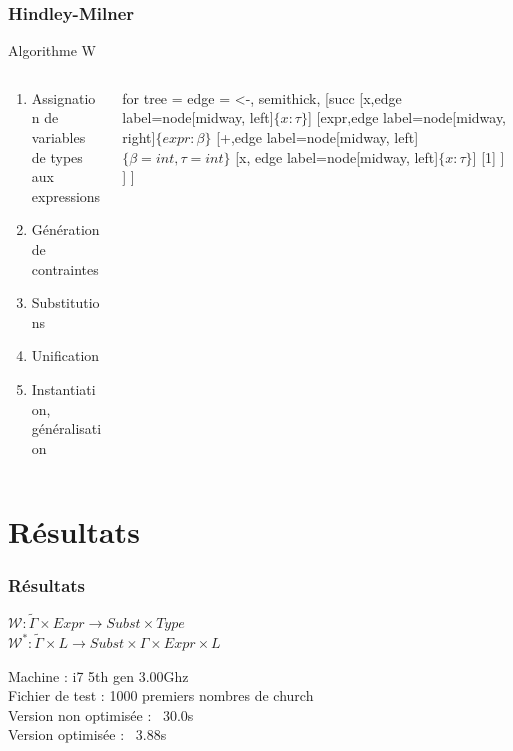 \documentclass{beamer}
\begin{document}
\begin{frame}
		\frametitle{Hindley-Milner}
		Algorithme W
		\begin{columns}
				\begin{column}{0.5\textwidth}
						\begin{enumerate}
								\item Assignation de variables de types aux expressions
								\item Génération de contraintes
								\item Substitutions
								\item Unification
								\item Instantiation, généralisation
						\end{enumerate}
				\end{column}
				\begin{column}{0.5\textwidth}
						\begin{forest}
								for tree = {
										edge = {<-, semithick},
								}
								[succ
								[x,edge label={node[midway, left]{$\{x:\tau\}$}}]
										[expr,edge label={node[midway, right]{$\{expr:\beta\}$}}
												[+,edge label={node[midway, left]{$\{\beta = int, \tau = int\}$}}
														[x, edge label={node[midway, left]{$\{x:\tau\}$}}]
														[1]	
												]
										]
								]
						\end{forest}
				\end{column}
		\end{columns}
\end{frame}

\section{Résultats}
\begin{frame}[t]
		\frametitle{Résultats}
		
		\begin{center}
				$\mathcal W : \tilde \Gamma \times Expr \to Subst \times Type$\\
				$\mathcal W^* : \tilde \Gamma \times L \to Subst \times \Gamma \times Expr \times L $	
		\end{center}
		
		Machine : i7 5th gen 3.00Ghz\\
		Fichier de test : 1000 premiers nombres de church\\
		Version non optimisée : ~30.0s\\
		Version optimisée : ~3.88s
\end{frame}
\end{document}
